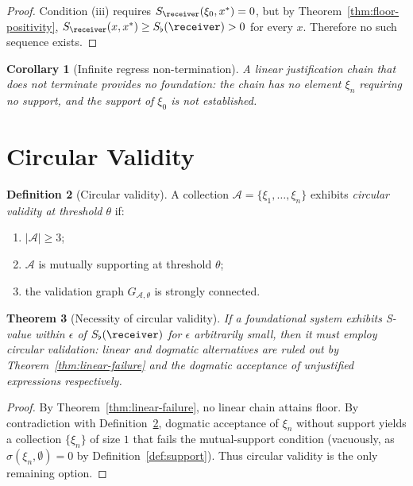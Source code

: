 \documentclass[11pt,a4paper]{article}
\theoremstyle{thmstyle}
\newtheorem{theorem}{Theorem}[section]
\newtheorem{corollary}[theorem]{Corollary}
\theoremstyle{thmstyle}
\theoremstyle{definition}
\newtheorem{definition}[theorem]{Definition}
\theoremstyle{remark}
\newcommand{\Ax}{\mathcal{A}}
\newcommand{\Sscalar}{S}
\newcommand{\Sfloor}{S_{\flat}}
\begin{document}
\begin{proof}
Condition (iii) requires
$\Sscalar_{\receiver}(\xi_{0}, x^{*}) = 0$, but by
Theorem~\ref{thm:floor-positivity},
$\Sscalar_{\receiver}(x, x^{*}) \geq
\Sfloor(\receiver) > 0$ for every $x$.  Therefore
no such sequence exists.
\end{proof}

\begin{corollary}[Infinite regress non-termination]
\label{cor:inf-regress}
A linear justification chain that does not terminate
provides no foundation: the chain has no element
$\xi_{n}$ requiring no support, and the support of
$\xi_{0}$ is not established.
\end{corollary}

\section{Circular Validity}
\label{sec:circular-validity}

\begin{definition}[Circular validity]\label{def:circular-validity}
A collection $\Ax = \{\xi_{1}, \ldots, \xi_{n}\}$
exhibits \emph{circular validity at threshold
$\theta$} if:
\begin{enumerate}[nosep,label=(\roman*)]
\item $|\Ax| \geq 3$;
\item $\Ax$ is mutually supporting at threshold
      $\theta$;
\item the validation graph $G_{\Ax, \theta}$ is
      strongly connected.
\end{enumerate}
\end{definition}

\begin{theorem}[Necessity of circular validity]
\label{thm:nec-circular}
If a foundational system exhibits S-value within
$\epsilon$ of $\Sfloor(\receiver)$ for $\epsilon$
arbitrarily small, then it must employ circular
validation: linear and dogmatic alternatives are
ruled out by Theorem~\ref{thm:linear-failure} and
the dogmatic acceptance of unjustified expressions
respectively.
\end{theorem}

\begin{proof}
By Theorem~\ref{thm:linear-failure}, no linear chain
attains floor.  By contradiction with
Definition~\ref{def:circular-validity}, dogmatic
acceptance of $\xi_{n}$ without support yields a
collection $\{\xi_{n}\}$ of size $1$ that fails the
mutual-support condition (vacuously, as
$\sigma(\xi_{n}, \emptyset) = 0$ by
Definition~\ref{def:support}).  Thus circular
validity is the only remaining option.
\end{proof}
\end{document}
